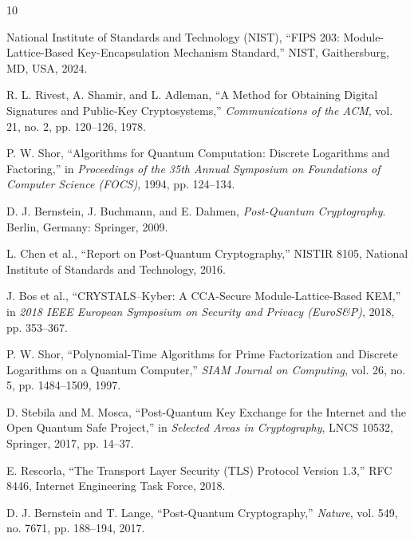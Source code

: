 \documentclass[12pt,a4paper]{article}
\begin{document}
\newpage
\begin{thebibliography}{10}

National Institute of Standards and Technology (NIST), ``FIPS 203: Module-Lattice-Based Key-Encapsulation Mechanism Standard,'' NIST, Gaithersburg, MD, USA, 2024.

R. L. Rivest, A. Shamir, and L. Adleman, ``A Method for Obtaining Digital Signatures and Public-Key Cryptosystems,'' \emph{Communications of the ACM}, vol. 21, no. 2, pp. 120--126, 1978.

P. W. Shor, ``Algorithms for Quantum Computation: Discrete Logarithms and Factoring,'' in \emph{Proceedings of the 35th Annual Symposium on Foundations of Computer Science (FOCS)}, 1994, pp. 124--134.

D. J. Bernstein, J. Buchmann, and E. Dahmen, \emph{Post-Quantum Cryptography}. Berlin, Germany: Springer, 2009.

L. Chen et al., ``Report on Post-Quantum Cryptography,'' NISTIR 8105, National Institute of Standards and Technology, 2016.

J. Bos et al., ``CRYSTALS--Kyber: A CCA-Secure Module-Lattice-Based KEM,'' in \emph{2018 IEEE European Symposium on Security and Privacy (EuroS\&P)}, 2018, pp. 353--367.

P. W. Shor, ``Polynomial-Time Algorithms for Prime Factorization and Discrete Logarithms on a Quantum Computer,'' \emph{SIAM Journal on Computing}, vol. 26, no. 5, pp. 1484--1509, 1997.

D. Stebila and M. Mosca, ``Post-Quantum Key Exchange for the Internet and the Open Quantum Safe Project,'' in \emph{Selected Areas in Cryptography}, LNCS 10532, Springer, 2017, pp. 14--37.

E. Rescorla, ``The Transport Layer Security (TLS) Protocol Version 1.3,'' RFC 8446, Internet Engineering Task Force, 2018.

D. J. Bernstein and T. Lange, ``Post-Quantum Cryptography,'' \emph{Nature}, vol. 549, no. 7671, pp. 188--194, 2017.

\end{thebibliography}
\end{document}

